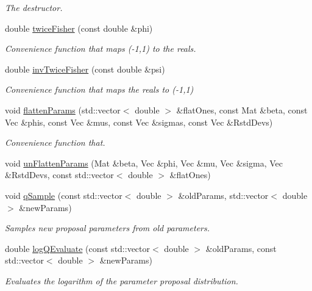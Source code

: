 \begin{DoxyCompactItemize}
\begin{DoxyCompactList}\small\item\em The destructor. \end{DoxyCompactList}\item 
double \hyperlink{classPmmh__jac__apf_ab4e3f02111c1232c54dbcc814e5778af}{twice\+Fisher} (const double \&phi)
\begin{DoxyCompactList}\small\item\em Convenience function that maps (-\/1,1) to the reals. \end{DoxyCompactList}\item 
double \hyperlink{classPmmh__jac__apf_ae96bbb73b47bab903061dcc1e0e5e14c}{inv\+Twice\+Fisher} (const double \&psi)
\begin{DoxyCompactList}\small\item\em Convenience function that maps the reals to (-\/1,1) \end{DoxyCompactList}\item 
void \hyperlink{classPmmh__jac__apf_a9f3f949aa9017178936878fe87c4fd79}{flatten\+Params} (std\+::vector$<$ double $>$ \&flat\+Ones, const Mat \&beta, const Vec \&phis, const Vec \&mus, const Vec \&sigmas, const Vec \&Rstd\+Devs)
\begin{DoxyCompactList}\small\item\em Convenience function that. \end{DoxyCompactList}\item 
void \hyperlink{classPmmh__jac__apf_a5d6152e013c3aba4a70d1a874364ae3b}{un\+Flatten\+Params} (Mat \&beta, Vec \&phi, Vec \&mu, Vec \&sigma, Vec \&Rstd\+Devs, const std\+::vector$<$ double $>$ \&flat\+Ones)
\item 
void \hyperlink{classPmmh__jac__apf_a863fc68aa67907e531c4da13afc74914}{q\+Sample} (const std\+::vector$<$ double $>$ \&old\+Params, std\+::vector$<$ double $>$ \&new\+Params)
\begin{DoxyCompactList}\small\item\em Samples new proposal parameters from old parameters. \end{DoxyCompactList}\item 
double \hyperlink{classPmmh__jac__apf_a49126fee9cb4daea00333c45f52945ee}{log\+Q\+Evaluate} (const std\+::vector$<$ double $>$ \&old\+Params, const std\+::vector$<$ double $>$ \&new\+Params)
\begin{DoxyCompactList}\small\item\em Evaluates the logarithm of the parameter proposal distribution. \end{DoxyCompactList}\item 

\end{DoxyCompactItemize}
